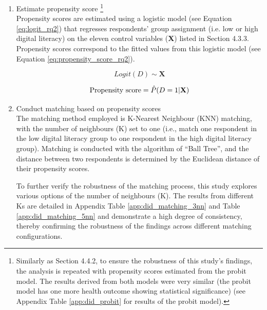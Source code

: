\begin{enumerate}[wide=0pt, leftmargin=*, labelwidth=0pt, labelindent=\parindent, itemindent=0pt]
    \item Estimate propensity score \footnote{Similarly as Section 4.4.2, to ensure the robustness of this study's findings, the analysis is repeated with propensity scores estimated from the probit model. The results derived from both models were very similar (the probit model has one more health outcome showing statistical significance) (see Appendix Table \ref{app:did_probit} for results of the probit model).} \\
    Propensity scores are estimated using a logistic model (see Equation \ref{eq:logit_rq2}) that regresses respondents' group assignment (i.e. low or high digital literacy) on the eleven control variables (\textbf{X}) listed in Section 4.3.3. Propensity scores correspond to the fitted values from this logistic model (see Equation \ref{eq:propensity_score_rq2}).

    \begin{equation}
        \label{eq:logit_rq2}
        Logit(D) \sim \textbf{X}
    \end{equation}
    
    \begin{equation}
        \label{eq:propensity_score_rq2}
        \textnormal{Propensity score} = \hat{P}(D = 1 | \textbf{X})
    \end{equation}

    \item Conduct matching based on propensity scores \\
    The matching method employed is K-Nearest Neighbour (KNN) matching, with the number of neighbours (K) set to one (i.e., match one respondent in the low digital literacy group to one respondent in the high digital literacy group). Matching is conducted with the algorithm of ``Ball Tree'', and the distance between two respondents is determined by the Euclidean distance of their propensity scores.  

    To further verify the robustness of the matching process, this study explores various options of the number of neighbours (K). The results from different Ks are detailed in Appendix Table \ref{app:did_matching_3nn} and Table \ref{app:did_matching_5nn} and demonstrate a high degree of consistency, thereby confirming the robustness of the findings across different matching configurations.


\end{enumerate}
